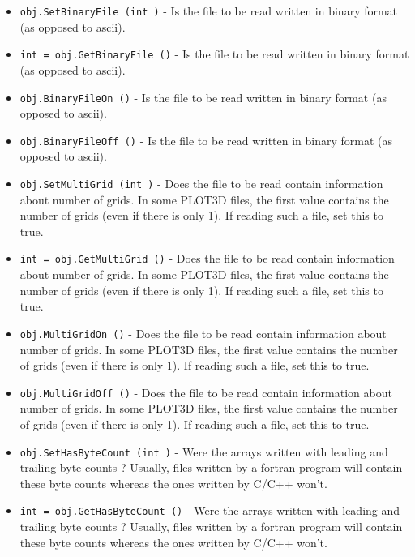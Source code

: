 \begin{itemize}
\item  \verb|obj.SetBinaryFile (int )| -  Is the file to be read written in binary format (as opposed
 to ascii).

\item  \verb|int = obj.GetBinaryFile ()| -  Is the file to be read written in binary format (as opposed
 to ascii).

\item  \verb|obj.BinaryFileOn ()| -  Is the file to be read written in binary format (as opposed
 to ascii).

\item  \verb|obj.BinaryFileOff ()| -  Is the file to be read written in binary format (as opposed
 to ascii).

\item  \verb|obj.SetMultiGrid (int )| -  Does the file to be read contain information about number of
 grids. In some PLOT3D files, the first value contains the number 
 of grids (even if there is only 1). If reading such a file,
 set this to true.

\item  \verb|int = obj.GetMultiGrid ()| -  Does the file to be read contain information about number of
 grids. In some PLOT3D files, the first value contains the number 
 of grids (even if there is only 1). If reading such a file,
 set this to true.

\item  \verb|obj.MultiGridOn ()| -  Does the file to be read contain information about number of
 grids. In some PLOT3D files, the first value contains the number 
 of grids (even if there is only 1). If reading such a file,
 set this to true.

\item  \verb|obj.MultiGridOff ()| -  Does the file to be read contain information about number of
 grids. In some PLOT3D files, the first value contains the number 
 of grids (even if there is only 1). If reading such a file,
 set this to true.

\item  \verb|obj.SetHasByteCount (int )| -  Were the arrays written with leading and trailing byte counts ?
 Usually, files written by a fortran program will contain these
 byte counts whereas the ones written by C/C++ won't.

\item  \verb|int = obj.GetHasByteCount ()| -  Were the arrays written with leading and trailing byte counts ?
 Usually, files written by a fortran program will contain these
 byte counts whereas the ones written by C/C++ won't.


\end{itemize}
